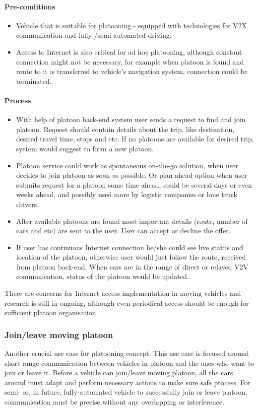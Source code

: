 \paragraph{Pre-conditions}
\begin{itemize}[noitemsep]
    \item Vehicle that is suitable for platooning - equipped with technologies for \acrshort{V2X} communication and fully-/semi-automated driving.
    \item Access to Internet is also critical for ad hoc platooning, although constant connection might not be necessary, for example when platoon is found and route to it is transferred to vehicle's navigation system, connection could be terminated.
\end{itemize}
% 
\paragraph{Process}
\begin{itemize}[noitemsep]
    \item With help of platoon back-end system user sends a request to find and join platoon. Request should contain details about the trip, like destination, desired travel time, stops and etc. If no platoons are available for desired trip, system would suggest to form a new platoon.
    \item Platoon service could work as spontaneous on-the-go solution, when user decides to join platoon as soon as possible. Or plan ahead option when user submits request for a platoon some time ahead, could be several days or even weeks ahead, and possibly used more by logistic companies or lone truck drivers.
    \item After available platoons are found most important details (route, number of cars and etc) are sent to the user. User can accept or decline the offer.
    \item If user has continuous Internet connection he/she could see live status and location of the platoon, otherwise user would just follow the route, received from platoon back-end. When cars are in the range of direct or relayed V2V communication, status of the platoon would be updated.
\end{itemize}
% 
There are concerns for Internet access implementation in moving vehicles and research is still in ongoing, although even periodical access should be enough for sufficient platoon organisation.\par
% 
\subsubsection{Join/leave moving platoon}
% 
Another crucial use case for platooning concept. This use case is focused around short range communication between vehicles in platoon and the ones who want to join or leave it. Before a vehicle can join/leave moving platoon, all the cars around must adapt and perform necessary actions to make sure safe process. For semi- or, in future, fully-automated vehicle to successfully join or leave platoon, communication must be precise without any overlapping or interference.\par
% 
